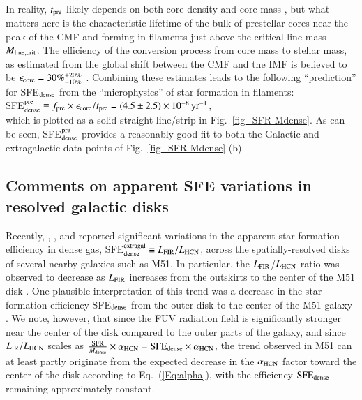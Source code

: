 \documentclass{aa}
\begin{document}
{{In reality, $t_{\rm pre} $ likely depends on both core density \citep{Jessop00} and core mass \citep{Hatchell08}, 
but what matters here is the characteristic lifetime of the bulk of prestellar cores near the peak of the CMF and forming in filaments just above 
the critical line mass $M_{\rm line, crit}$. 
The efficiency of the conversion process from core mass to stellar mass, as estimated from the global shift between the CMF and the IMF 
is believed to be $\epsilon_{\rm core} = 30\%^{+20\%}_{-10\%} $ \citep[e.g.][]{Alves07,Nutter07,Konyves15}. 
Combining these estimates leads to the following ``prediction'' for SFE$_{\rm dense}$ 
from the ``microphysics'' of star formation in filaments:\\
SFE$_{\rm dense}^{\rm pre} \equiv f_{\rm pre} \times \epsilon_{\rm core} / t_{\rm pre} = (4.5\pm2.5)\times 10^{-8}\, {\rm yr}^{-1} $,\\ 
which is plotted as a solid straight line/strip in Fig.~\ref{fig_SFR-Mdense}. 
As can be seen, SFE$_{\rm dense}^{\rm pre}$ provides a reasonably good fit to both the Galactic and extragalactic data points of Fig.~\ref{fig_SFR-Mdense} (b).

\subsection{Comments on apparent SFE variations in resolved galactic disks}

Recently, \citet{Usero15}, \citet{Chen15}, and \citet{Bigiel16} reported significant variations 
in the apparent star formation efficiency in dense gas, SFE$^{\rm extragal}_{\rm dense} \equiv L_{\rm FIR}/L_{\rm HCN}$, 
across the spatially-resolved disks of several nearby galaxies such as M51.
In particular, the $L_{\rm FIR}$/$L_{\rm HCN}$ ratio was observed to decrease as $L_{\rm FIR}$ increases from the outskirts 
to the center of the M51 disk \citep[see for instance the map of the $L_{\rm IR}$/$L_{\rm HCN}$ ratio presented by][]{Chen15}.
One plausible interpretation of this trend was a decrease in the star formation efficiency 
SFE$_{\rm dense}$ from the outer disk to the center of the M51 galaxy \citep[e.g.][]{Bigiel16}. 
We note, however, that since the FUV radiation field is significantly stronger near the center of the disk compared to the outer parts of the galaxy, 
and since $L_{\rm IR}/L_{\rm HCN}$ scales as $ \frac{\rm SFR}{M_{\rm dense}} \times \alpha_{\rm HCN} = {\rm SFE_{dense}} \times \alpha_{\rm HCN}$, 
the trend observed in M51 can at least partly originate from the expected decrease in the $\alpha_{\rm HCN} $ factor 
toward the center of the disk according to Eq.~(\ref{Eq:alpha}), with the efficiency  ${\rm SFE_{dense}}$ remaining approximately constant.


}}
\end{document}
